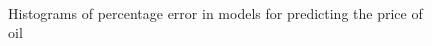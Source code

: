\documentclass[runningheads]{llncs}
\begin{document}
\begin{figure}
\\
\caption{Histograms of percentage error in models for predicting the price of oil}
\label{fig:OilErrorHistogram.png}
\end{figure}
\end{document}
